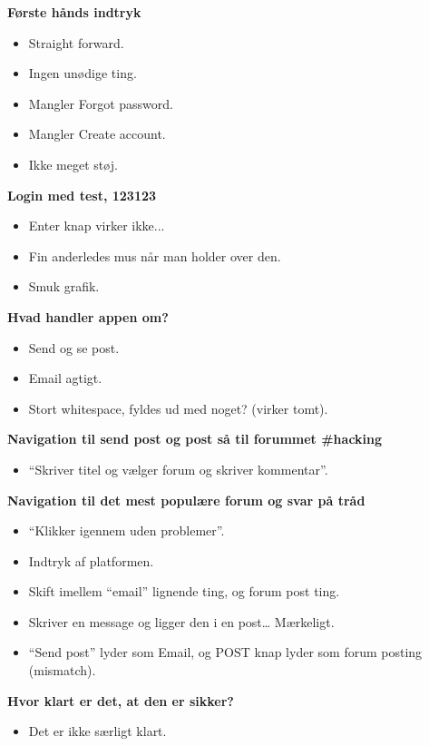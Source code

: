\noindent\textbf{Første hånds indtryk}
\begin{itemize}
    \item Straight forward.
    \item Ingen unødige ting.
    \item Mangler Forgot password.
    \item Mangler Create account.
    \item Ikke meget støj.
\end{itemize}

\noindent\textbf{Login med test, 123123}
\begin{itemize}
    \item Enter knap virker ikke... 
    \item Fin anderledes mus når man holder over den.
    \item Smuk grafik.
\end{itemize}

\noindent\textbf{Hvad handler appen om?}
\begin{itemize}
    \item Send og se post. 
    \item Email agtigt.
    \item Stort whitespace, fyldes ud med noget? (virker tomt).
\end{itemize}

\noindent\textbf{Navigation til send post og post så til forummet \#hacking}
\begin{itemize}
    \item “Skriver titel og vælger forum og skriver kommentar”.
\end{itemize}

\noindent\textbf{Navigation til det mest populære forum og svar på tråd}
\begin{itemize}
    \item “Klikker igennem uden problemer”.
    \item Indtryk af platformen.
    \item Skift imellem “email” lignende ting, og forum post ting.
    \item Skriver en message og ligger den i en post… Mærkeligt.
    \item “Send post” lyder som Email, og POST knap lyder som forum posting (mismatch).
\end{itemize}

\noindent\textbf{Hvor klart er det, at den er sikker?}
\begin{itemize}
    \item Det er ikke særligt klart.
\end{itemize}

